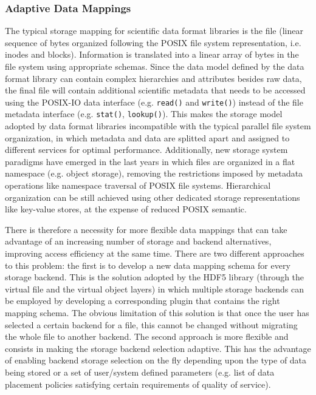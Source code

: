 \documentclass{../../template/esiwace-report}
\begin{document}
\subsubsection{Adaptive Data Mappings}
The typical storage mapping for scientific data format libraries is the file (linear sequence of bytes organized following the POSIX file system representation, i.e. inodes and blocks). Information is translated into a linear array of bytes in the file system using appropriate schemas. Since the data model defined by the data format library can contain complex hierarchies and attributes besides raw data, the final file will contain additional scientific metadata that needs to be accessed using the POSIX-IO data interface (e.g. \texttt{read()} and \texttt{write()}) instead of the file metadata interface (e.g. \texttt{stat()}, \texttt{lookup()}). This makes the storage model adopted by data format libraries incompatible with the typical parallel file system organization, in which metadata and data are splitted apart and assigned to different services for optimal performance. Additionally, new storage system paradigms have emerged in the last years in which files are organized in a flat namespace (e.g. object storage), removing the restrictions imposed by metadata operations like namespace traversal of POSIX file systems. Hierarchical organization can be still achieved using other dedicated storage representations like key-value stores, at the expense of reduced POSIX semantic.

There is therefore a necessity for more flexible data mappings that can take advantage of an increasing number of storage and backend alternatives, improving access efficiency at the same time. There are two different approaches to this problem: the first is to develop a new data mapping schema for every storage backend. This is the solution adopted by the HDF5 library (through the virtual file and the virtual object layers) in which multiple storage backends can be employed by developing a corresponding plugin that contains the right mapping schema. The obvious limitation of this solution is that once the user has selected a certain backend for a file, this cannot be changed without migrating the whole file to another backend. The second approach is more flexible and consists in making the storage backend selection adaptive. This has the advantage of enabling backend storage selection on the fly depending upon the type of data being stored or a set of user/system defined parameters (e.g. list of data placement policies satisfying certain requirements of quality of service).
\end{document}
